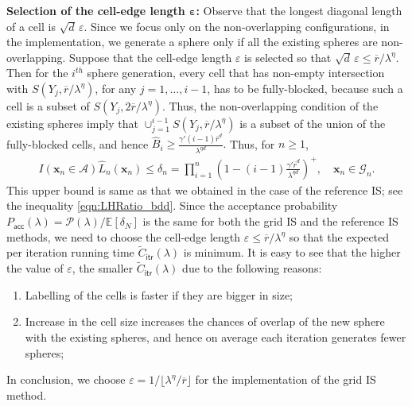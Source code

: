 \documentclass[11pt]{article}
\newcommand{\ee}{\mathbb{E}}
\newcommand{\rbdd}{\overline{r}}
\newcommand{\lt}{\left}
\newcommand{\rt}{\right}
\newcommand{\wt}{\widetilde}
\newcommand{\wh}{\widehat}
\newcommand{\pno}{\mathcal{P}(\lambda)}
\newcommand{\lfs}{\mathbf{x}}
\begin{document}
\noindent
{\bf Selection of the cell-edge length $\boldsymbol{\varepsilon}$:} Observe that the longest diagonal length of a cell is $\sqrt{d}\, \varepsilon$. Since we focus only on the non-overlapping configurations, in the implementation, we generate a sphere only if all the existing spheres are non-overlapping. Suppose that the cell-edge length $\varepsilon$ is selected so that 
$\displaystyle \sqrt{d}\, \varepsilon \leq \rbdd/\lambda^\eta.$
Then for the $i^{th}$ sphere generation, every cell that has non-empty intersection with $S(Y_j, \rbdd/\lambda^\eta)$, for any ${j =1, \dots, i-1}$, has to be fully-blocked, because such a cell is a subset of $S\lt(Y_j, 2\rbdd/\lambda^\eta\rt)$. Thus, the non-overlapping condition of the existing spheres imply that 
$\cup_{j = 1}^{i -1} S(Y_j, \rbdd/\lambda^\eta)$ is a subset of the union of the fully-blocked cells, and hence ${\wh B_i \geq \frac{\gamma' (i -1)\rbdd^d}{\lambda^{\eta d}}}.$
Thus, for $n \geq 1$,
\begin{align}
\label{eqn:lhr_grid_bdd}
 I(\lfs_n \in \mathscr{A})\wh L_n(\lfs_n) \leq \delta_{n} =  \prod_{i=1}^{n} \lt( 1 - (i-1) \frac{\gamma' \rbdd^d}{ \lambda^{\eta d}}  \rt)^+,\quad \lfs_n \in  {\mathscr{G}}_n.
\end{align}
This upper bound is same as that we obtained in the case of the reference IS; see the inequality \eqref{eqn:LHRatio_bdd}.  Since the acceptance probability ${P_{\mathsf{acc}}(\lambda)= \pno/\ee[\delta_N]}$ is the same for both the grid IS and the reference IS methods, we need to choose the cell-edge length $\varepsilon \leq \rbdd/\lambda^\eta$ so that the expected per iteration running time $\wt C_{\mathsf{itr}}(\lambda)$ is minimum. It is easy to see that the higher the value of $\varepsilon$, the smaller $\wt C_{\mathsf{itr}}(\lambda)$ due to the following reasons:
\begin{enumerate}
\item Labelling of the cells is faster if they are bigger in size;
\item Increase in the cell size increases the chances of overlap of the new sphere with the existing spheres, and hence on average each iteration generates fewer spheres; 
\end{enumerate}
In conclusion, we choose $\varepsilon = 1/ \lfloor \lambda^\eta/\rbdd\rfloor$ for the implementation of the grid IS method. \\
\end{document}
